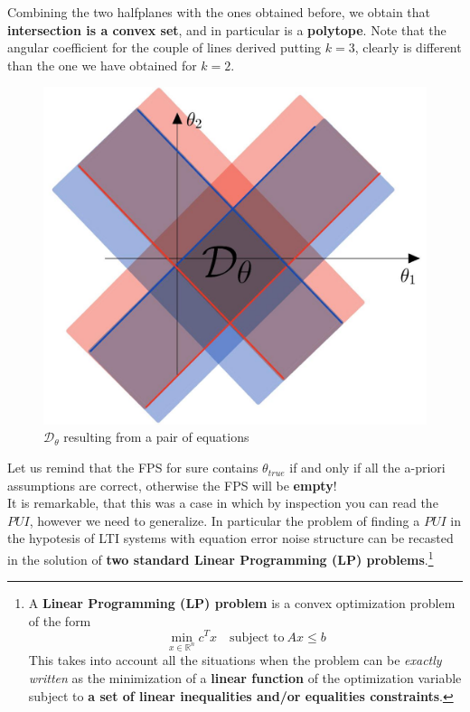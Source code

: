 \noindent
Combining the two halfplanes with the ones obtained before, we obtain that \textbf{intersection is a convex set}, and in particular is a \textbf{polytope}. Note that the angular coefficient for the couple of lines derived putting $k=3$, clearly is different than the one we have obtained for $k=2$.

\begin{figure}[h]
    \centering
    \includegraphics[scale=0.2]{img/polytope1.jpeg}
    \caption{$\mathcal{D}_\theta$ resulting from a pair of equations}
\end{figure}

{\color{blue}
\noindent
Let us remind that the FPS for sure contains $\theta_{true}$
if and only if all the a-priori assumptions are correct, otherwise the FPS will be \textbf{empty}!}\\
It is remarkable, that this was a case in which by inspection you can read the $PUI$, however we need to generalize. In particular the problem of finding a $PUI$ in the hypotesis of LTI systems with equation error noise structure can be recasted in the solution of \textbf{two standard Linear Programming (LP) problems}.\footnote{
    \noindent
    A \textbf{Linear Programming (LP) problem} is a convex optimization problem of the form
    \begin{equation*}
        \min_{x\in\mathbb{R}^n} {c^T{x}} \quad \text{subject to} \ Ax \le b
    \end{equation*}
    This takes into account all the situations when the problem can be \textit{exactly written} as the minimization of a \textbf{linear function} of the optimization variable subject to \textbf{a set of linear inequalities and/or equalities constraints}.
}

